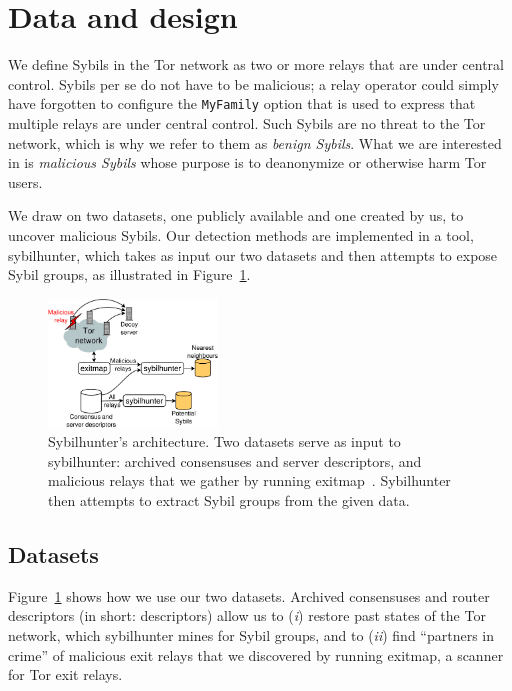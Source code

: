 \section{Data and design}
\label{sec:design}
We define Sybils in the Tor network as two or more relays that are under central
control.  Sybils per se do not have to be malicious; a relay operator could
simply have forgotten to configure the \texttt{MyFamily} option that is used to
express that multiple relays are under central control.  Such Sybils are no
threat to the Tor network, which is why we refer to them as \emph{benign
Sybils}.  What we are interested in is \emph{malicious Sybils} whose purpose is
to deanonymize or otherwise harm Tor users.

We draw on two datasets, one publicly available and one created by us, to
uncover malicious Sybils.  Our detection methods are implemented in a tool,
sybilhunter, which takes as input our two datasets and then attempts to expose
Sybil groups, as illustrated in Figure~\ref{fig:system}.

\begin{figure}[t]
	\centering
	\includegraphics[width=0.4\textwidth]{diagrams/system_architecture.pdf}
	\caption{Sybilhunter's architecture.  Two datasets serve as input to
		sybilhunter: archived consensuses and server descriptors, and malicious
		relays that we gather by running exitmap~\cite{Winter2014a}.
		Sybilhunter then attempts to extract Sybil groups from the given data.}
	\label{fig:system}
\end{figure}

\subsection{Datasets}
\label{sec:datasets}
Figure~\ref{fig:system} shows how we use our two datasets.  Archived consensuses
and router descriptors (in short: descriptors) allow us to (\emph{i}) restore
past states of the Tor network, which sybilhunter mines for Sybil groups, and to
(\emph{ii}) find ``partners in crime'' of malicious exit relays that we
discovered by running exitmap, a scanner for Tor exit relays.

